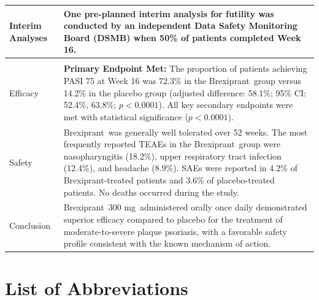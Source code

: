 \documentclass[11pt, a4paper]{article}
\newcommand{\studydrug}{Brexiprant}
\newcommand{\studydose}{300 mg}
\begin{document}
\begin{tabularx}{\linewidth}{@{}>{\color{accent}\bfseries\raggedright}p{38mm}@{\hspace{6mm}}>{\raggedright\arraybackslash}X@{}}
Interim Analyses          & One pre-planned interim analysis for futility was conducted by an independent Data Safety Monitoring Board (DSMB) when 50\% of patients completed Week 16. \\
\midrule
\multicolumn{2}{@{}l}{\textbf{\large\color{accent}Summary of Results}}\\
\midrule
Efficacy                 & \textbf{Primary Endpoint Met:} The proportion of patients achieving PASI 75 at Week 16 was 72.3\% in the \studydrug\ group versus 14.2\% in the placebo group (adjusted difference: 58.1\%; 95\% CI: 52.4\%, 63.8\%; $p < 0.0001$). All key secondary endpoints were met with statistical significance ($p < 0.0001$). \\
Safety                   & \studydrug\ was generally well tolerated over 52 weeks. The most frequently reported TEAEs in the \studydrug\ group were nasopharyngitis (18.2\%), upper respiratory tract infection (12.4\%), and headache (8.9\%). SAEs were reported in 4.2\% of \studydrug-treated patients and 3.6\% of placebo-treated patients. No deaths occurred during the study. \\
Conclusion               & \studydrug\ \studydose\ administered orally once daily demonstrated superior efficacy compared to placebo for the treatment of moderate-to-severe plaque psoriasis, with a favorable safety profile consistent with the known mechanism of action. \\
\bottomrule
\end{tabularx}
\renewcommand{\arraystretch}{1.0}

\newpage

\tableofcontents
\newpage

\section*{List of Abbreviations}
\end{document}
